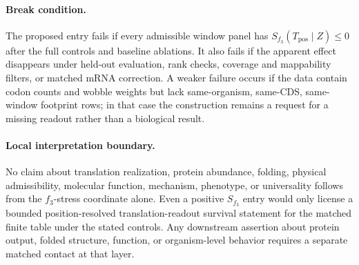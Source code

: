 \paragraph{Break condition.}
The proposed entry fails if every admissible window panel has $S_{f_3}(T_{\mathrm{pos}}\mid Z)\leq 0$ after the full controls and baseline ablations.  It also fails if the apparent effect disappears under held-out evaluation, rank checks, coverage and mappability filters, or matched mRNA correction.  A weaker failure occurs if the data contain codon counts and wobble weights but lack same-organism, same-CDS, same-window footprint rows; in that case the construction remains a request for a missing readout rather than a biological result.

\paragraph{Local interpretation boundary.}
No claim about translation realization, protein abundance, folding, physical admissibility, molecular function, mechanism, phenotype, or universality follows from the $f_3$-stress coordinate alone.  Even a positive $S_{f_3}$ entry would only license a bounded position-resolved translation-readout survival statement for the matched finite table under the stated controls.  Any downstream assertion about protein output, folded structure, function, or organism-level behavior requires a separate matched contact at that layer.
